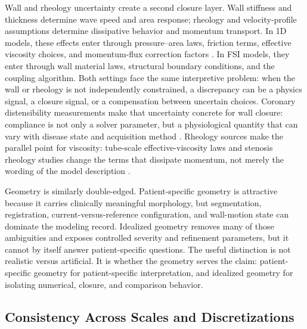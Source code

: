 Wall and rheology uncertainty create a second closure layer. Wall stiffness and
thickness determine wave speed and area response; rheology and velocity-profile
assumptions determine dissipative behavior and momentum transport. In 1D models,
these effects enter through pressure--area laws, friction terms, effective
viscosity choices, and momentum-flux correction factors
\cite{ShiEtAl2011BloodFlowModelReview}. In FSI models, they enter through wall
material laws, structural boundary conditions, and the coupling algorithm. Both
settings face the same interpretive problem: when the wall or rheology is not
independently constrained, a discrepancy can be a physics signal, a closure
signal, or a compensation between uncertain choices.
Coronary distensibility measurements make that uncertainty concrete for wall
closure: compliance is not only a solver parameter, but a physiological
quantity that can vary with disease state and acquisition method
\cite{KelleEtAl2011CoronaryDistensibility}. Rheology sources make the parallel
point for viscosity: tube-scale effective-viscosity laws and stenosis rheology
studies change the terms that dissipate momentum, not merely the wording of the
model description
\cite{PriesEtAl1992BloodViscosityTubeFlow,KumarEtAl2019CarreauYasudaHemodynamics,LiuEtAl2021ICASRheology}.

Geometry is similarly double-edged. Patient-specific geometry is attractive
because it carries clinically meaningful morphology, but segmentation,
registration, current-versus-reference configuration, and wall-motion state can
dominate the modeling record. Idealized geometry removes many of those
ambiguities and exposes controlled severity and refinement parameters, but it
cannot by itself answer patient-specific questions. The useful distinction is
not realistic versus artificial. It is whether the geometry serves the claim:
patient-specific geometry for patient-specific interpretation, and idealized
geometry for isolating numerical, closure, and comparison behavior.

\subsection{Consistency Across Scales and Discretizations}
\label{subsec:synthesis-consistency-verification-validation}

